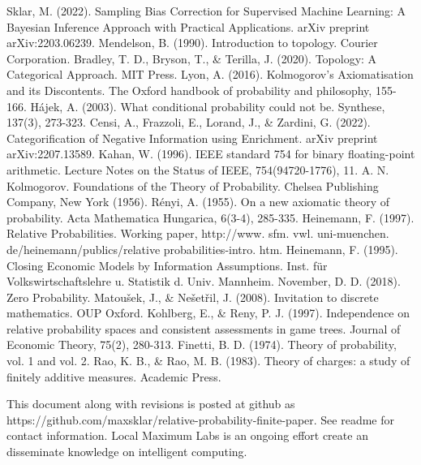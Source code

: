 \documentclass[twoside]{article}
\theoremstyle{plain}%
\theoremstyle{definition}
\theoremstyle{remark}
\begin{document}
\begin{thebibliography}{20}

Sklar, M. (2022). Sampling Bias Correction for Supervised Machine Learning: A Bayesian Inference Approach with Practical Applications. arXiv preprint arXiv:2203.06239.
Mendelson, B. (1990). Introduction to topology. Courier Corporation.
Bradley, T. D., Bryson, T., \& Terilla, J. (2020). Topology: A Categorical Approach. MIT Press.
Lyon, A. (2016). Kolmogorov’s Axiomatisation and its Discontents. The Oxford handbook of probability and philosophy, 155-166.
Hájek, A. (2003). What conditional probability could not be. Synthese, 137(3), 273-323.
Censi, A., Frazzoli, E., Lorand, J., \& Zardini, G. (2022). Categorification of Negative Information using Enrichment. arXiv preprint arXiv:2207.13589.
Kahan, W. (1996). IEEE standard 754 for binary floating-point arithmetic. Lecture Notes on the Status of IEEE, 754(94720-1776), 11.
A. N. Kolmogorov. Foundations of the Theory of Probability. Chelsea Publishing Company, New York
(1956). 
Rényi, A. (1955). On a new axiomatic theory of probability. Acta Mathematica Hungarica, 6(3-4), 285-335.
Heinemann, F. (1997). Relative Probabilities. Working paper, http://www. sfm. vwl. uni-muenchen. de/heinemann/publics/relative probabilities-intro. htm.
Heinemann, F. (1995). Closing Economic Models by Information Assumptions. Inst. für Volkswirtschaftslehre u. Statistik d. Univ. Mannheim.
November, D. D. (2018). Zero Probability.
Matoušek, J., \& Nešetřil, J. (2008). Invitation to discrete mathematics. OUP Oxford.
Kohlberg, E., \& Reny, P. J. (1997). Independence on relative probability spaces and consistent assessments in game trees. Journal of Economic Theory, 75(2), 280-313.
Finetti, B. D. (1974). Theory of probability, vol. 1 and vol. 2.
Rao, K. B., \& Rao, M. B. (1983). Theory of charges: a study of finitely additive measures. Academic Press.

\end{thebibliography}

This document along with revisions is posted at github as https://github.com/maxsklar/relative-probability-finite-paper. See readme for contact information. Local Maximum Labs is an ongoing effort create an disseminate knowledge on intelligent computing.
\end{document}

